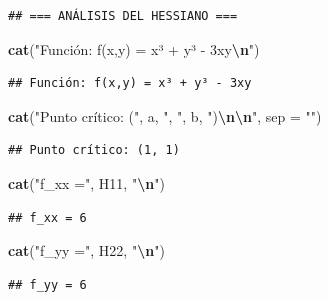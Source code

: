 \documentclass[
]{book}
\newenvironment{Shaded}{\begin{snugshade}}{\end{snugshade}}
\newcommand{\AttributeTok}[1]{\textcolor[rgb]{0.13,0.29,0.53}{#1}}
\newcommand{\FunctionTok}[1]{\textcolor[rgb]{0.13,0.29,0.53}{\textbf{#1}}}
\newcommand{\NormalTok}[1]{#1}
\newcommand{\SpecialCharTok}[1]{\textcolor[rgb]{0.81,0.36,0.00}{\textbf{#1}}}
\newcommand{\StringTok}[1]{\textcolor[rgb]{0.31,0.60,0.02}{#1}}
\begin{document}
\begin{verbatim}
## === ANÁLISIS DEL HESSIANO ===
\end{verbatim}

\begin{Shaded}
\begin{Highlighting}[]
\FunctionTok{cat}\NormalTok{(}\StringTok{"Función: f(x,y) = x³ + y³ {-} 3xy}\SpecialCharTok{\textbackslash{}n}\StringTok{"}\NormalTok{)}
\end{Highlighting}
\end{Shaded}

\begin{verbatim}
## Función: f(x,y) = x³ + y³ - 3xy
\end{verbatim}

\begin{Shaded}
\begin{Highlighting}[]
\FunctionTok{cat}\NormalTok{(}\StringTok{"Punto crítico: ("}\NormalTok{, a, }\StringTok{", "}\NormalTok{, b, }\StringTok{")}\SpecialCharTok{\textbackslash{}n\textbackslash{}n}\StringTok{"}\NormalTok{, }\AttributeTok{sep =} \StringTok{""}\NormalTok{)}
\end{Highlighting}
\end{Shaded}

\begin{verbatim}
## Punto crítico: (1, 1)
\end{verbatim}

\begin{Shaded}
\begin{Highlighting}[]
\FunctionTok{cat}\NormalTok{(}\StringTok{"f\_xx ="}\NormalTok{, H11, }\StringTok{"}\SpecialCharTok{\textbackslash{}n}\StringTok{"}\NormalTok{)}
\end{Highlighting}
\end{Shaded}

\begin{verbatim}
## f_xx = 6
\end{verbatim}

\begin{Shaded}
\begin{Highlighting}[]
\FunctionTok{cat}\NormalTok{(}\StringTok{"f\_yy ="}\NormalTok{, H22, }\StringTok{"}\SpecialCharTok{\textbackslash{}n}\StringTok{"}\NormalTok{)}
\end{Highlighting}
\end{Shaded}

\begin{verbatim}
## f_yy = 6
\end{verbatim}
\end{document}
